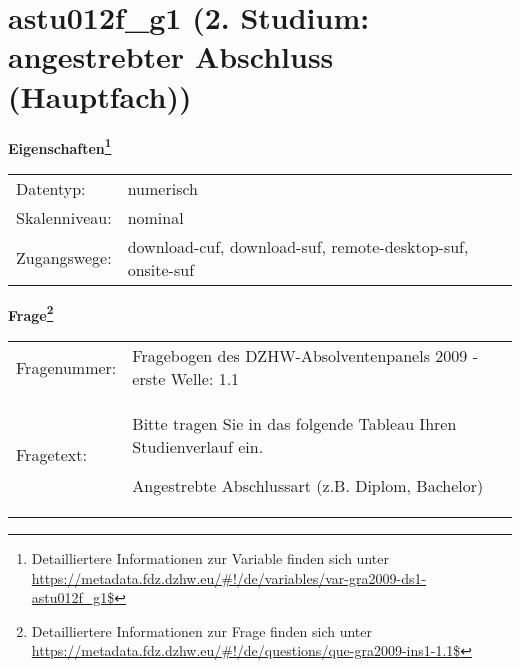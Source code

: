 
    \setcounter{footnote}{0}

    \vspace*{-1.8cm}
	\section{astu012f\_g1 (2. Studium: angestrebter Abschluss (Hauptfach))}
	\label{section:astu012f_g1}



    \vspace*{0.5cm}
    \noindent\textbf{Eigenschaften\footnote{Detailliertere Informationen zur Variable finden sich unter
		\url{https://metadata.fdz.dzhw.eu/\#!/de/variables/var-gra2009-ds1-astu012f_g1$}}}\\
	\begin{tabularx}{\hsize}{@{}lX}
	Datentyp: & numerisch \\
	Skalenniveau: & nominal \\
	Zugangswege: &
	  download-cuf, 
	  download-suf, 
	  remote-desktop-suf, 
	  onsite-suf
 \\
    \end{tabularx}



				\vspace*{0.5cm}
                \noindent\textbf{Frage\footnote{Detailliertere Informationen zur Frage finden sich unter
		              \url{https://metadata.fdz.dzhw.eu/\#!/de/questions/que-gra2009-ins1-1.1$}}}\\
				\begin{tabularx}{\hsize}{@{}lX}
					Fragenummer: &
					  Fragebogen des DZHW-Absolventenpanels 2009 - erste Welle:
					  1.1
 \\
					Fragetext: & Bitte tragen Sie in das folgende Tableau Ihren Studienverlauf ein.\par  Angestrebte Abschlussart (z.B. Diplom, Bachelor) \\
				\end{tabularx}





